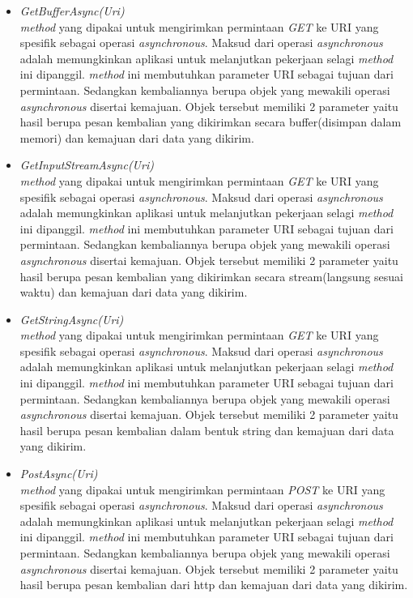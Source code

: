\begin{itemize}
	\item \textit{GetBufferAsync(Uri)} \\
	\textit{method} yang dipakai untuk mengirimkan permintaan \textit{GET} ke URI yang spesifik sebagai operasi \textit{asynchronous}. Maksud dari operasi \textit{asynchronous} adalah memungkinkan aplikasi untuk melanjutkan pekerjaan selagi \textit{method} ini dipanggil\footnotemark[2]. \textit{method} ini membutuhkan parameter URI sebagai tujuan dari permintaan. Sedangkan kembaliannya berupa objek yang mewakili operasi \textit{asynchronous} disertai kemajuan. Objek tersebut memiliki 2 parameter yaitu hasil berupa pesan kembalian yang dikirimkan secara buffer(disimpan dalam memori) dan kemajuan dari data yang dikirim.
	\item \textit{GetInputStreamAsync(Uri)} \\
	\textit{method} yang dipakai untuk mengirimkan permintaan \textit{GET} ke URI yang spesifik sebagai operasi \textit{asynchronous}. Maksud dari operasi \textit{asynchronous} adalah memungkinkan aplikasi untuk melanjutkan pekerjaan selagi \textit{method} ini dipanggil\footnotemark[2]. \textit{method} ini membutuhkan parameter URI sebagai tujuan dari permintaan. Sedangkan kembaliannya berupa objek yang mewakili operasi \textit{asynchronous} disertai kemajuan. Objek tersebut memiliki 2 parameter yaitu hasil berupa pesan kembalian yang dikirimkan secara stream(langsung sesuai waktu) dan kemajuan dari data yang dikirim.
	\item \textit{GetStringAsync(Uri)} \\
	\textit{method} yang dipakai untuk mengirimkan permintaan \textit{GET} ke URI yang spesifik sebagai operasi \textit{asynchronous}. Maksud dari operasi \textit{asynchronous} adalah memungkinkan aplikasi untuk melanjutkan pekerjaan selagi \textit{method} ini dipanggil\footnotemark[2]. \textit{method} ini membutuhkan parameter URI sebagai tujuan dari permintaan. Sedangkan kembaliannya berupa objek yang mewakili operasi \textit{asynchronous} disertai kemajuan. Objek tersebut memiliki 2 parameter yaitu hasil berupa pesan kembalian dalam bentuk string dan kemajuan dari data yang dikirim.
	\item \textit{PostAsync(Uri)} \\
	\textit{method} yang dipakai untuk mengirimkan permintaan \textit{POST} ke URI yang spesifik sebagai operasi \textit{asynchronous}. Maksud dari operasi \textit{asynchronous} adalah memungkinkan aplikasi untuk melanjutkan pekerjaan selagi \textit{method} ini dipanggil\footnotemark[2]. \textit{method} ini membutuhkan parameter URI sebagai tujuan dari permintaan. Sedangkan kembaliannya berupa objek yang mewakili operasi \textit{asynchronous} disertai kemajuan. Objek tersebut memiliki 2 parameter yaitu hasil berupa pesan kembalian dari http dan kemajuan dari data yang dikirim.

\end{itemize}
